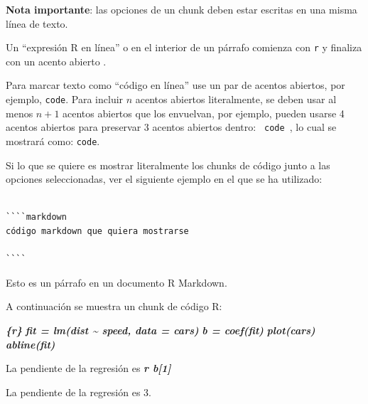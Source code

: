 \documentclass[12pt,a4paper,]{book}
\newenvironment{Shaded}{\begin{snugshade}}{\end{snugshade}}
\newcommand{\InformationTok}[1]{\textcolor[rgb]{0.56,0.35,0.01}{\textbf{\textit{#1}}}}
\newcommand{\NormalTok}[1]{#1}
\numberwithin{dummy}{section}
\theoremstyle{ocrenumbox}
\theoremstyle{blacknumex}
\theoremstyle{blacknumbox}
\theoremstyle{ocrenum}
\theoremstyle{ocrenum}
\begin{document}
\textbf{Nota importante}: las opciones de un chunk deben estar escritas
en una misma línea de texto.

Un ``expresión R en línea'' o en el interior de un párrafo comienza con
\texttt{\textasciigrave{}r} y finaliza con un acento abierto
\texttt{\textasciigrave{}}.

Para marcar texto como ``código en línea'' use un par de acentos
abiertos, por ejemplo, \texttt{\textasciigrave{}code\textasciigrave{}}.
Para incluir \(n\) acentos abiertos literalmente, se deben usar al menos
\(n+1\) acentos abiertos que los envuelvan, por ejemplo, pueden usarse 4
acentos abiertos para preservar 3 acentos abiertos dentro:
\texttt{\textasciigrave{}\textasciigrave{}\textasciigrave{}\textasciigrave{}\ \textasciigrave{}\textasciigrave{}\textasciigrave{}code\textasciigrave{}\textasciigrave{}\textasciigrave{}\ \textasciigrave{}\textasciigrave{}\textasciigrave{}\textasciigrave{}},
lo cual se mostrará como:
\texttt{\textasciigrave{}\textasciigrave{}\textasciigrave{}code\textasciigrave{}\textasciigrave{}\textasciigrave{}}.

Si lo que se quiere es mostrar literalmente los chunks de código junto a
las opciones seleccionadas, ver el siguiente ejemplo en el que se ha
utilizado:

\begin{verbatim}

````markdown
código markdown que quiera mostrarse

````
\end{verbatim}

\begin{Shaded}
\begin{Highlighting}[]
\NormalTok{Esto es un párrafo en un documento R Markdown.}

\NormalTok{A continuación se muestra un chunk de código R:}

\InformationTok{\textasciigrave{}\textasciigrave{}\textasciigrave{}\{r\}}
\InformationTok{fit = lm(dist \textasciitilde{} speed, data = cars)}
\InformationTok{b   = coef(fit)}
\InformationTok{plot(cars)}
\InformationTok{abline(fit)}
\InformationTok{\textasciigrave{}\textasciigrave{}\textasciigrave{}}

\NormalTok{La pendiente de la regresión es }\InformationTok{\textasciigrave{}r b[1]\textasciigrave{}}
\end{Highlighting}
\end{Shaded}

La pendiente de la regresión es 3.
\end{document}
